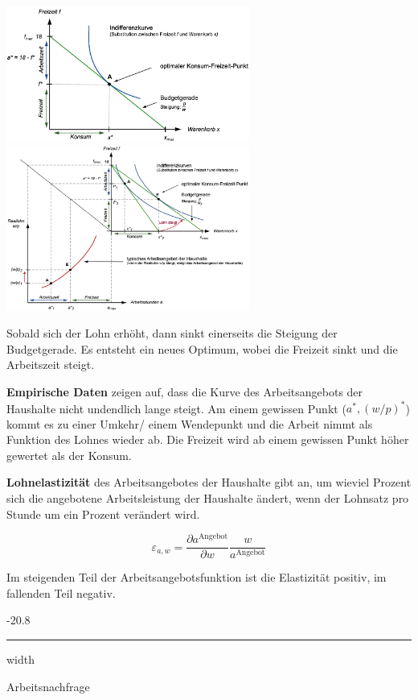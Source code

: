 \documentclass[9pt, landscape, fleqn]{scrartcl}
\makeatletter
\renewcommand{\subsubsection}{\@startsection{subsubsection}{1}{0mm}%
{-2\baselineskip}{0.8\baselineskip}%
{\hrule depth 0.2pt width\columnwidth\vspace*{1.2em}\normalsize\bfseries\rmfamily}}
\makeatother
\begin{document}
\begin{multicols*}{3}
\begin{center}
    \includegraphics[width=8cm]{Arbeitsangebot.png}
    \includegraphics[width=8cm]{Arbeitsangebot_2.png}
\end{center}

Sobald sich der Lohn erhöht, dann sinkt einerseits die Steigung der Budgetgerade. Es entsteht ein neues Optimum, wobei die Freizeit sinkt und die Arbeitszeit steigt. \newline

\textbf{Empirische Daten} zeigen auf, dass die Kurve des Arbeitsangebots der Haushalte nicht undendlich lange steigt. Am einem gewissen Punkt ($a^*, (w/p)^*$) kommt es zu einer Umkehr/ einem Wendepunkt und die Arbeit nimmt als Funktion des Lohnes wieder ab. Die Freizeit wird ab einem gewissen Punkt höher gewertet als der Konsum. \newline

\textbf{Lohnelastizität} des Arbeitsangebotes der Haushalte gibt an, um wieviel Prozent sich die angebotene Arbeitsleistung der Haushalte ändert, wenn der Lohnsatz pro Stunde um ein Prozent verändert wird.

\begin{equation}
    \varepsilon_{a,w} = \frac{\partial a^{\text{Angebot}}}{\partial w} \frac{w}{a^{\text{Angebot}}}
\end{equation}

Im steigenden Teil der Arbeitsangebotsfunktion ist die Elastizität positiv, im fallenden Teil negativ.

\subsubsection{Arbeitsnachfrage}


\end{multicols*}
\end{document}
